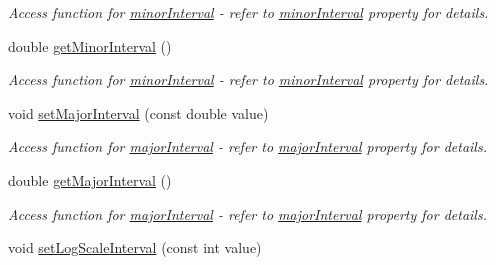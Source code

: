\begin{DoxyCompactItemize}
\begin{DoxyCompactList}\small\item\em Access function for \hyperlink{classQEAnalogIndicator_a8727d8c84409a4b1c51c0c4140c65a45}{minorInterval} -\/ refer to \hyperlink{classQEAnalogIndicator_a8727d8c84409a4b1c51c0c4140c65a45}{minorInterval} property for details. \end{DoxyCompactList}\item 
\hypertarget{classQEAnalogIndicator_a0893c3622a3766eeebceb174bfcf2e1d}{
double \hyperlink{classQEAnalogIndicator_a0893c3622a3766eeebceb174bfcf2e1d}{getMinorInterval} ()}
\label{classQEAnalogIndicator_a0893c3622a3766eeebceb174bfcf2e1d}

\begin{DoxyCompactList}\small\item\em Access function for \hyperlink{classQEAnalogIndicator_a8727d8c84409a4b1c51c0c4140c65a45}{minorInterval} -\/ refer to \hyperlink{classQEAnalogIndicator_a8727d8c84409a4b1c51c0c4140c65a45}{minorInterval} property for details. \end{DoxyCompactList}\item 
\hypertarget{classQEAnalogIndicator_a172c6704657f2d5b3359ed13c32b00ae}{
void \hyperlink{classQEAnalogIndicator_a172c6704657f2d5b3359ed13c32b00ae}{setMajorInterval} (const double value)}
\label{classQEAnalogIndicator_a172c6704657f2d5b3359ed13c32b00ae}

\begin{DoxyCompactList}\small\item\em Access function for \hyperlink{classQEAnalogIndicator_a9b3fb4ab140aacdaa66b0c02df3d5a3e}{majorInterval} -\/ refer to \hyperlink{classQEAnalogIndicator_a9b3fb4ab140aacdaa66b0c02df3d5a3e}{majorInterval} property for details. \end{DoxyCompactList}\item 
\hypertarget{classQEAnalogIndicator_af3e32c2a52f1eb2e20a78ecc94b1bb35}{
double \hyperlink{classQEAnalogIndicator_af3e32c2a52f1eb2e20a78ecc94b1bb35}{getMajorInterval} ()}
\label{classQEAnalogIndicator_af3e32c2a52f1eb2e20a78ecc94b1bb35}

\begin{DoxyCompactList}\small\item\em Access function for \hyperlink{classQEAnalogIndicator_a9b3fb4ab140aacdaa66b0c02df3d5a3e}{majorInterval} -\/ refer to \hyperlink{classQEAnalogIndicator_a9b3fb4ab140aacdaa66b0c02df3d5a3e}{majorInterval} property for details. \end{DoxyCompactList}\item 
\hypertarget{classQEAnalogIndicator_ae5bd2899109bae2ad58350ebdc30fcac}{
void \hyperlink{classQEAnalogIndicator_ae5bd2899109bae2ad58350ebdc30fcac}{setLogScaleInterval} (const int value)}
\label{classQEAnalogIndicator_ae5bd2899109bae2ad58350ebdc30fcac}


\end{DoxyCompactItemize}
